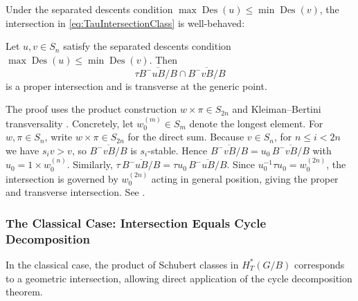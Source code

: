 Under the separated descents condition $\max\operatorname{Des}(u) \leq \min\operatorname{Des}(v)$, the intersection in \cref{eq:TauIntersectionClass} is well-behaved:

\begin{Lemma}
\label{tab:TauProperIntersection}
Let $u, v \in S_n$ satisfy the separated descents condition $\max\operatorname{Des}(u) \leq \min\operatorname{Des}(v)$. Then
$$\tau\overline{B^-uB/B} \cap \overline{B^-vB/B}$$
is a proper intersection and is transverse at the generic point.
\end{Lemma}

\begin{Proof}
The proof uses the product construction $w \times \pi \in S_{2n}$ and Kleiman--Bertini transversality \cite[Section 19.3]{AndersonFulton}. Concretely, let $w_0^{(m)} \in S_m$ denote the longest element. For $w, \pi \in S_n$, write $w \times \pi \in S_{2n}$ for the direct sum. Because $v \in S_n$, for $n \leq i < 2n$ we have $s_i v > v$, so $\overline{B^-vB/B}$ is $s_i$-stable. Hence $\overline{B^-vB/B} = u_0\,\overline{B^-vB/B}$ with $u_0 = 1 \times w_0^{(n)}$. Similarly, $\tau\,\overline{B^-uB/B} = \tau u_0\,\overline{B^-uB/B}$. Since $u_0^{-1}\tau u_0 = w_0^{(2n)}$, the intersection is governed by $w_0^{(2n)}$ acting in general position, giving the proper and transverse intersection. See \cite[Section 19.3]{AndersonFulton}.
\end{Proof}

\bigskip

\subsubsection{The Classical Case: Intersection Equals Cycle Decomposition}
\label{sec:ClassicalTripleProof}

In the classical case, the product of Schubert classes in $H_T^*(G/B)$ corresponds to a geometric intersection, allowing direct application of the cycle decomposition theorem.

